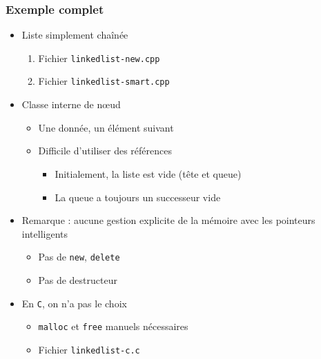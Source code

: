 \begin{frame}
\frametitle{Exemple complet}
\begin{itemize}[<+->]
\item Liste simplement chaînée
	\begin{enumerate}
	\item Fichier \texttt{linkedlist-new.cpp}
	\item Fichier \texttt{linkedlist-smart.cpp}
	\end{enumerate}
\item Classe interne de nœud
	\begin{itemize}
	\item Une donnée, un élément suivant
	\item Difficile d'utiliser des références
		\begin{itemize}
		\item Initialement, la liste est vide (tête et queue)
		\item La queue a toujours un successeur vide
		\end{itemize}	
	\end{itemize}
\item Remarque : aucune gestion explicite de la mémoire avec les pointeurs intelligents
	\begin{itemize}
	\item Pas de \lstinline|new|, \lstinline|delete|
	\item Pas de destructeur
	\end{itemize}
\item En \texttt{C}, on n'a pas le choix
	\begin{itemize}
	\item \texttt{malloc} et \texttt{free} manuels nécessaires
	\item Fichier \texttt{linkedlist-c.c}
	\end{itemize}
\end{itemize}
\end{frame}

